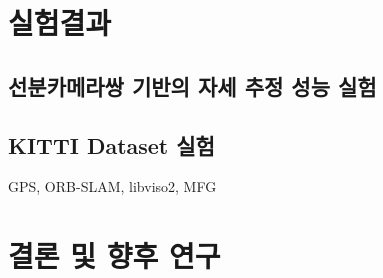 \documentclass[master,korean,final]{cbnu-ecs}
\begin{document}
\chapter{실험결과}
\section{선분카메라쌍 기반의 자세 추정 성능 실험}
\section{KITTI Dataset 실험}
GPS, ORB-SLAM, libviso2, MFG

\chapter{결론 및 향후 연구}

\end{document}
